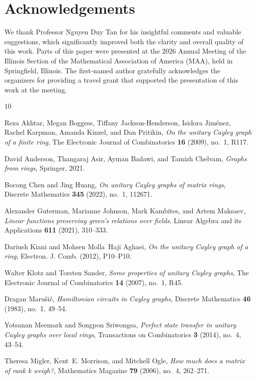 \documentclass[12pt, a4paper]{amsart}
\theoremstyle{definition}
\numberwithin{equation}{section}
\begin{document}
\section*{Acknowledgements}
We thank Professor Nguyen Duy Tan for his insightful comments and valuable suggestions, which significantly improved both the clarity and overall quality of this work. Parts of this paper were presented at the 2026 Annual Meeting of the Illinois Section of the Mathematical Association of America (MAA), held in Springfield, Illinois. The first-named author gratefully acknowledges the organizers for providing a travel grant that supported the presentation of this work at the meeting.
\begin{thebibliography}{10}

Reza Akhtar, Megan Boggess, Tiffany Jackson-Henderson, Isidora Jim{\'e}nez, Rachel Karpman, Amanda Kinzel, and Dan Pritikin, \emph{On the unitary {Cayley} graph of a finite ring}, The Electronic Journal of Combinatorics \textbf{16} (2009), no.~1, R117.

David Anderson, Thangaraj Asir, Ayman Badawi, and Tamizh Chelvam, \emph{Graphs from rings}, Springer, 2021.

Bocong Chen and Jing Huang, \emph{On unitary {Cayley} graphs of matrix rings}, Discrete Mathematics \textbf{345} (2022), no.~1, 112671.

Alexander Guterman, Marianne Johnson, Mark Kambites, and Artem Maksaev, \emph{Linear functions preserving green's relations over fields}, Linear Algebra and its Applications \textbf{611} (2021), 310--333.

Dariush Kiani and Mohsen Molla~Haji Aghaei, \emph{On the unitary {Cayley} graph of a ring}, Electron. J. Comb. (2012), P10--P10.

Walter Klotz and Torsten Sander, \emph{Some properties of unitary {Cayley} graphs}, The Electronic Journal of Combinatorics \textbf{14} (2007), no.~1, R45.

Dragan Marušič, \emph{Hamiltonian circuits in {Cayley} graphs}, Discrete Mathematics \textbf{46} (1983), no.~1, 49--54.

Yotsanan Meemark and Songpon Sriwongsa, \emph{Perfect state transfer in unitary {C}ayley graphs over local rings}, Transactions on Combinatorics \textbf{3} (2014), no.~4, 43--54.

Theresa Migler, Kent~E. Morrison, and Mitchell Ogle, \emph{How much does a matrix of rank k weigh?}, Mathematics Magazine \textbf{79} (2006), no.~4, 262--271.


\end{thebibliography}
\end{document}
